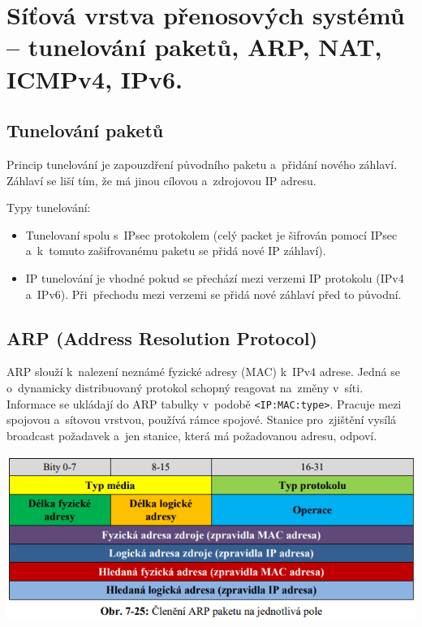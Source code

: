 \clearpage
\section{Síťová vrstva přenosových systémů -- tunelování paketů, ARP, NAT, ICMPv4, IPv6.}

\subsection{Tunelování paketů}

Princip tunelování je zapouzdření původního paketu a~přidání nového záhlaví. Záhlaví se liší tím, že má jinou cílovou a~zdrojovou IP adresu.

Typy tunelování:
\begin{itemize}[noitemsep]
    \item Tunelovaní spolu s~IPsec protokolem (celý packet je šifrován pomocí IPsec a~k~tomuto zašifrovanému paketu se přidá nové IP záhlaví).
    \item IP tunelování je vhodné pokud se přechází mezi verzemi IP protokolu (IPv4 a~IPv6). Při~přechodu mezi verzemi se přidá nové záhlaví před to původní.
\end{itemize}

\subsection{ARP (Address Resolution Protocol)}

ARP slouží k~nalezení neznámé fyzické adresy (MAC) k~IPv4 adrese. Jedná se o~dynamicky distribuovaný protokol schopný reagovat na~změny v~síti. Informace se ukládají do ARP tabulky v~podobě \texttt{<IP:MAC:type>}. Pracuje mezi spojovou a~sítovou vrstvou, používá rámce spojové. Stanice pro~zjištění vysílá broadcast požadavek a~jen stanice, která má požadovanou adresu, odpoví.

\begin{center}
	\includegraphics[scale=0.5]{images/-038.png}
\end{center}

